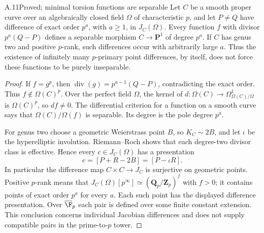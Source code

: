 \begin{claim}{A.11}{Proved; minimal torsion functions are separable}
Let $C$ be a smooth proper curve over an algebraically closed field
$\Omega$ of characteristic $p$, and let $P\ne Q$ have difference
of exact order $p^a$, with $a\ge1$, in $J_C(\Omega)$.
Every function $f$ with divisor $p^a(Q-P)$ defines a separable
morphism $C\to\mathbf P^1$ of degree $p^a$.
If $C$ has genus two and positive $p$-rank, such differences
occur with arbitrarily large $a$. Thus the existence of
infinitely many $p$-primary point differences, by itself, does
not force these functions to be purely inseparable.
\end{claim}
\begin{proof}
If $f=g^p$, then
$\operatorname{div}(g)=p^{a-1}(Q-P)$, contradicting the
exact order. Thus $f\notin\Omega(C)^p$. Over the perfect
field $\Omega$, the kernel of
$d:\Omega(C)\to\Omega^1_{\Omega(C)/\Omega}$ is
$\Omega(C)^p$, so $df\ne0$. The differential criterion for
a function on a smooth curve says that
$\Omega(C)/\Omega(f)$ is separable. Its degree is the pole
degree $p^a$.

For genus two choose a geometric Weierstrass point $B$, so
$K_C\sim2B$, and let $\iota$ be the hyperelliptic involution.
Riemann--Roch shows that each degree-two divisor class is
effective. Hence every $c\in J_C(\Omega)$ has a presentation
\[
 c=[P+R-2B]=[P-\iota R].
\]
In particular the difference map $C\times C\to J_C$ is
surjective on geometric points. Positive $p$-rank means that
$J_C(\Omega)[p^\infty]\simeq(\mathbf Q_p/\mathbf Z_p)^f$
with $f>0$; it contains points of exact order $p^a$ for every
$a$. Each such point has the displayed difference presentation.
Over $\overline{\F}_p$ each pair is defined over some finite
constant extension. This conclusion concerns individual
Jacobian differences and does not supply compatible pairs in
the prime-to-$p$ tower.
\end{proof}

